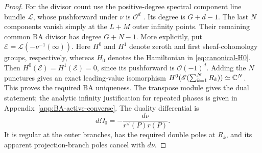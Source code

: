 \begin{proof}
For the divisor count use the positive-degree spectral component
line bundle $\mathscr L$, whose pushforward under $\nu$ is
$\mathcal O^d$ \cite{Beauville1990}. Its degree is $G+d-1$.
The last $N$ components vanish simply at the $L+M$ outer infinity
points. Their remaining common BA divisor has degree $G+N-1$.
More explicitly, put $\mathscr E=\mathscr L(-\nu^{-1}(\infty))$.
Here $H^0$ and $H^1$ denote zeroth and first sheaf-cohomology
groups, respectively, whereas $H_0$ denotes the Hamiltonian in
\cref{eq:canonical-H0}.
Then $H^0(\mathscr E)=H^1(\mathscr E)=0$, since its pushforward is
$\mathcal O(-1)^d$. Adding the $N$ punctures gives an exact
leading-value isomorphism
$H^0(\mathscr E(\sum_{k=1}^{N}R_k))\simeq\mathbb C^N$.
This proves the required BA uniqueness. The transpose module gives
the dual statement; the analytic infinity justification for repeated
phases is given in Appendix~\ref{app:BA-active-converse}.
The duality differential is
\begin{equation}\label{eq:BA-converse-duality}
 d\Omega_0=-\frac{d\nu}{r^{\vee}(P)r(P)}.
\end{equation}
It is regular at the outer branches, has the required double poles
at $R_k$, and its apparent projection-branch poles cancel with $d\nu$.


\end{proof}
